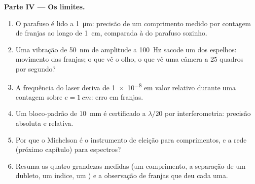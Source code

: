 \begin{problem}
\medskip
\noindent\textbf{Parte IV --- Os limites.}
\begin{enumerate}[resume]
  \item O parafuso é lido a \qty{1}{\micro m}: precisão de um comprimento
        medido por contagem de franjas ao longo de \qty{1}{cm}, comparada à do parafuso
        sozinho.
  \item Uma vibração de \qty{50}{nm} de amplitude a \qty{100}{Hz} sacode um dos
        espelhos: movimento das franjas; o que vê o olho, o que vê uma
        câmera a $25$ quadros por segundo?
  \item A frequência do laser deriva de \qty{1e-8}{} em valor relativo
        durante uma contagem sobre $e = \qty{1}{cm}$: erro em franjas.
  \item Um bloco-padrão de \qty{10}{mm} é certificado a $\lambda/20$ por
        interferometria: precisão absoluta e relativa.
  \item Por que o Michelson é o instrumento de eleição para comprimentos, e
        a rede (próximo capítulo) para espectros?
  \item Resuma as quatro grandezas medidas (um comprimento, a separação
        de um dubleto, um índice, um ) e a observação
        de franjas que deu cada uma.
\end{enumerate}
\end{problem}

